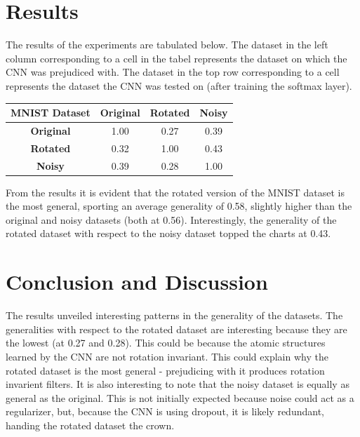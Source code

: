\documentclass[conference,compsoc]{IEEEtran}
\begin{document}
\section{Results}
The results of the experiments are tabulated below. The dataset in the left column corresponding to a cell in the tabel represents the dataset on which the CNN was prejudiced with. The dataset in the top row corresponding to a cell represents the dataset the CNN was tested on (after training the softmax layer). 
 \renewcommand{\arraystretch}{1.2}
 \begin{center}
   \begin{tabular}{ | c || c | c | c | }
     \hline 
     \textbf{MNIST Dataset} & \textbf{Original} & \textbf{Rotated} & \textbf{Noisy} \\ \hline
     \hline
     \textbf{Original} & 1.00 & 0.27 & 0.39 \\ \hline
     \textbf{Rotated} & 0.32 & 1.00 & 0.43 \\ \hline
     \textbf{Noisy}  & 0.39 & 0.28 & 1.00 \\ \hline
   \end{tabular}
 \end{center}
 
From the results it is evident that the rotated version of the MNIST dataset is the most general, sporting an average generality of 0.58, slightly higher than the original and noisy datasets (both at 0.56). Interestingly, the generality of the rotated dataset with respect to the noisy dataset topped the charts at 0.43. 


\section{Conclusion and Discussion}
%
The results unveiled interesting patterns in the generality of the datasets. The generalities with respect to the rotated dataset are interesting because they are the lowest (at 0.27 and 0.28). This could be because the atomic structures learned by the CNN are not rotation invariant. This could explain why the rotated dataset is the most general - prejudicing with it produces rotation invarient filters. It is also interesting to note that the noisy dataset is equally as general as the original. This is not initially expected because noise could act as a regularizer, but, because the CNN is using dropout, it is likely redundant, handing the rotated dataset the crown. 

\nocite{*}

%





  



\end{document}
